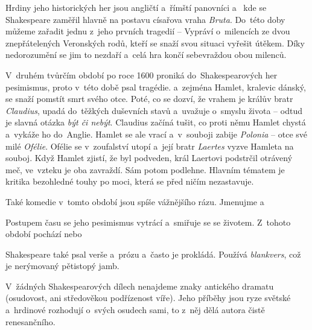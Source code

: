 Hrdiny jeho historických her jsou angličtí a~římští panovníci   
 a~ kde se Shakespeare zaměřil hlavně na postavu císařova vraha \textit{Bruta}.
Do~této doby můžeme zařadit jednu z~jeho prvních tragedií --  Vypráví o~milencích ze dvou znepřátelených
Veronských rodů, kteří se snaží svou situaci vyřešit útěkem. Díky nedorozumění se jim to nezdaří a~celá hra končí
sebevraždou obou milenců.

V~druhém tvůrčím období po roce 1600 proniká do~Shakespearových her pesimismus, proto v~této době psal tragédie.
    a~zejména 
Hamlet, kralevic dánský, se snaží pomstít smrt svého otce. Poté, co se dozví, že vrahem je králův bratr \textit{Claudius},
upadá do~těžkých duševních stavů a~uvažuje o~smyslu života -- odtud je slavná otázka \textit{být či nebýt}.
Claudius začíná tušit, co proti němu Hamlet chystá a~vykáže ho do~Anglie. Hamlet se ale vrací a~v~souboji zabije 
\textit{Polonia} -- otce své milé \textit{Ofélie}. Ofélie se v~zoufalství utopí a~její bratr \textit{Laertes}
vyzve Hamleta na souboj. Když Hamlet zjistí, že byl podveden, král Laertovi podstrčil otrávený meč, ve~vzteku je oba 
zavraždí. Sám potom podlehne. Hlavním tématem je kritika bezohledné touhy po moci, která se před ničím nezastavuje.

Také komedie v~tomto období jsou spíše vážnějšího rázu. Jmenujme  
a~

Postupem času se jeho pesimismus vytrácí a~smiřuje se se životem. Z~tohoto období pochází 
nebo 

Shakespeare také psal verše a~prózu a~často je prokládá. Používá \textit{blankvers}, 
což je nerýmovaný pětistopý jamb.

V~žádných Shakespearových dílech nenajdeme znaky antického dramatu (osudovost, ani středověkou podřízenost víře).
Jeho příběhy jsou ryze světské a~hrdinové rozhodují o~svých osudech sami, to z~něj dělá autora čistě renesančního.